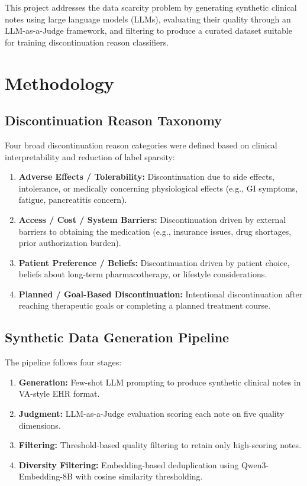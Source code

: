 \documentclass[11pt, a4paper]{article}
\begin{document}
This project addresses the data scarcity problem by generating synthetic clinical notes using large language models (LLMs), evaluating their quality through an LLM-as-a-Judge framework, and filtering to produce a curated dataset suitable for training discontinuation reason classifiers.

\section{Methodology}

\subsection{Discontinuation Reason Taxonomy}

Four broad discontinuation reason categories were defined based on clinical interpretability and reduction of label sparsity:

\begin{enumerate}
    \item \textbf{Adverse Effects / Tolerability:} Discontinuation due to side effects, intolerance, or medically concerning physiological effects (e.g., GI symptoms, fatigue, pancreatitis concern).
    \item \textbf{Access / Cost / System Barriers:} Discontinuation driven by external barriers to obtaining the medication (e.g., insurance issues, drug shortages, prior authorization burden).
    \item \textbf{Patient Preference / Beliefs:} Discontinuation driven by patient choice, beliefs about long-term pharmacotherapy, or lifestyle considerations.
    \item \textbf{Planned / Goal-Based Discontinuation:} Intentional discontinuation after reaching therapeutic goals or completing a planned treatment course.
\end{enumerate}

\subsection{Synthetic Data Generation Pipeline}

The pipeline follows four stages:

\begin{enumerate}
    \item \textbf{Generation:} Few-shot LLM prompting to produce synthetic clinical notes in VA-style EHR format.
    \item \textbf{Judgment:} LLM-as-a-Judge evaluation scoring each note on five quality dimensions.
    \item \textbf{Filtering:} Threshold-based quality filtering to retain only high-scoring notes.
    \item \textbf{Diversity Filtering:} Embedding-based deduplication using Qwen3-Embedding-8B with cosine similarity thresholding.
\end{enumerate}
\end{document}
